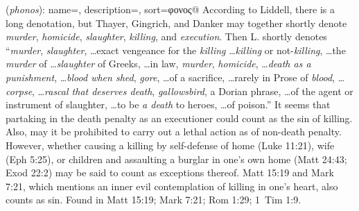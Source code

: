 \item[Killing,]

(\textit{phonos}):
{
    name=,
    description={},
    sort=φονος@
}
According to Liddell, there is a long denotation, but Thayer, Gingrich, and Danker may together shortly denote \emph{murder}, \emph{homicide}, \emph{slaughter}, \emph{killing}, and \emph{execution}. Then L. shortly denotes ``\emph{murder}, \emph{slaughter}, \ldots exact vengeance for the \emph{killing} \ldots \emph{killing} or not-\emph{killing}, \ldots the \emph{murder} of \ldots \emph{slaughter} of Greeks, \ldots in law, \emph{murder}, \emph{homicide}, \ldots \emph{death as a punishment}, \ldots \emph{blood when shed}, \emph{gore}, \ldots of a sacrifice, \ldots rarely in Prose of \emph{blood}, \ldots \emph{corpse}, \ldots \emph{rascal that deserves death}, \emph{gallowsbird}, a Dorian phrase, \ldots of the agent or instrument of slaughter, \ldots to be \emph{a death} to heroes, \ldots of poison.'' It seems that partaking in the death penalty as an executioner could count as the sin of killing. Also, may it be prohibited to carry out a lethal action as of non-death penalty. However, whether causing a killing by self-defense of home (Luke 11:21), wife (Eph 5:25), or children and assaulting a burglar in one's own home (Matt 24:43; Exod 22:2) may be said to count as exceptions thereof. Matt 15:19 and Mark 7:21, which mentions an inner evil contemplation of killing in one's heart, also counts as sin.
Found in Matt 15:19; Mark 7:21; Rom 1:29; 1~Tim 1:9.
